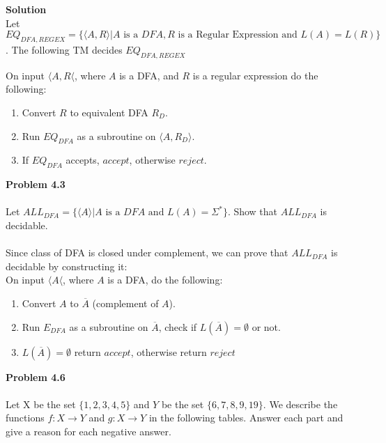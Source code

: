 \documentclass{article}
\newcommand\curl[1]{\{#1\}}
\newcommand{\problem}[1]{\large{\textbf{Problem #1}}\\}
\begin{document}
\textbf{Solution}\\
    
    Let $EQ_{DFA,REGEX} = \curl{\langle A, R \rangle | A \text{ is a } DFA, R \text{ is a Regular Expression and } L(A) = L(R)} $. The following TM 
    decides $EQ_{DFA,REGEX}$
    
    On input $ \langle A,R \langle $, where $A$ is a DFA, and $R$ is a regular expression do the following:
    \begin{enumerate}[1., leftmargin = 1.5cm]
    \itemsep0em
    \item Convert $R$ to equivalent DFA $R_{D}$.
    \item Run $EQ_{DFA}$ as a subroutine on $\langle A, R_{D} \rangle$.
    \item If $EQ_{DFA}$ accepts, $accept$, otherwise $reject$.
    \end{enumerate}

\pagebreak

\problem{4.3} \\

    Let $ALL_{DFA} = \curl{\langle A \rangle | A \text{ is a } DFA \text{ and } L(A) = \Sigma^*} $. Show that $ALL_{DFA}$ is decidable.\\ \\
    
    Since class of DFA is closed under complement, we can prove that $ALL_{DFA}$ is decidable by constructing it:\\

    On input $ \langle A \langle $, where $A$ is a DFA, do the following:
    \begin{enumerate}[1., leftmargin = 1.5cm]
    \itemsep0em
    \item Convert $A$ to $\overline{A}$ (complement of $A$).
    \item Run $E_{DFA}$ as a subroutine on $\overline{A}$, check if $L(\overline{A}) = \emptyset $ or not.
    \item $L(\overline{A}) = \emptyset $ return $accept$, otherwise return $reject$
    \end{enumerate}

\problem{4.6} \\

    Let X be the set $\curl{1,2,3,4,5}$ and $Y$ be the set $\curl{6,7,8,9,19}$. We describe the functions $ f : X \rightarrow Y$ and $g: X \rightarrow Y$
    in the following tables. Answer each part and give a reason for each negative answer.
\end{document}
